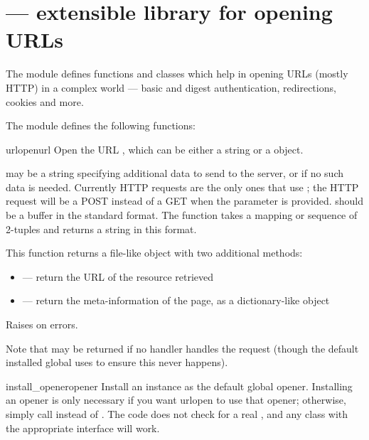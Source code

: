 \section{ ---
         extensible library for opening URLs}



The  module defines functions and classes which help
in opening URLs (mostly HTTP) in a complex world --- basic and digest
authentication, redirections, cookies and more.

The  module defines the following functions:

\begin{funcdesc}{urlopen}{url}
Open the URL , which can be either a string or a 
object.

 may be a string specifying additional data to send to the
server, or  if no such data is needed. 
Currently HTTP requests are the only ones that use ;
the HTTP request will be a POST instead of a GET when the 
parameter is provided.   should be a buffer in the standard
 format.  The
 function takes a mapping or sequence of
2-tuples and returns a string in this format.

This function returns a file-like object with two additional methods:

\begin{itemize}
  \item {} --- return the URL of the resource retrieved
  \item {} --- return the meta-information of the page, as
                            a dictionary-like object
\end{itemize}

Raises  on errors.

Note that  may be returned if no handler handles the
request (though the default installed global 
uses  to ensure this never happens).
\end{funcdesc}

\begin{funcdesc}{install_opener}{opener}
Install an  instance as the default global
opener.  Installing an opener is only necessary if you want urlopen to
use that opener; otherwise, simply call 
instead of .  The code does not check for a real
, and any class with the appropriate interface
will work.
\end{funcdesc}

